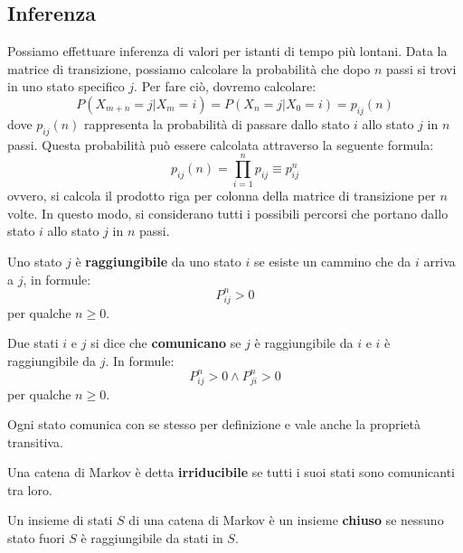 \subsection{Inferenza}
Possiamo effettuare inferenza di valori per istanti di tempo più lontani.
Data la matrice di transizione, possiamo calcolare la probabilità che dopo $n$
passi si trovi in uno stato specifico $j$. Per fare ciò, dovremo calcolare:
\begin{equation}
    P(X_{m + n} = j | X_{m} = i) = P(X_n = j | X_0 = i)=p_{ij}(n)
\end{equation}
dove $p_{ij}(n)$ rappresenta la probabilità di passare dallo stato $i$ allo stato
$j$ in $n$ passi. Questa probabilità può essere calcolata attraverso la seguente
formula:
\begin{equation}
    p_{ij}(n) = \prod_{i = 1}^{n} p_{ij} \equiv p^n_{ij}
\end{equation}
ovvero, si calcola il prodotto riga per colonna della matrice di transizione
per $n$ volte. In questo modo, si considerano tutti i possibili percorsi che
portano dallo stato $i$ allo stato $j$ in $n$ passi.
\begin{definizione}
    Uno stato $j$ è \textbf{raggiungibile} da uno stato $i$ se esiste un cammino
    che da $i$ arriva a $j$, in formule:
    \begin{equation*}
        P^n_{ij}>0
    \end{equation*}
    per qualche $n\geq 0$.
\end{definizione}
\begin{definizione}
    Due stati $i$ e $j$ si dice che \textbf{comunicano} se $j$ è raggiungibile
    da $i$ e $i$ è raggiungibile da $j$. In formule:
    \begin{equation*}
        P^n_{ij}>0 \land P^n_{ji}>0
    \end{equation*}
    per qualche $n\geq 0$.
\end{definizione}
\begin{nota}
    Ogni stato comunica con se stesso per definizione e vale anche la proprietà
    transitiva.
\end{nota}
\begin{definizione}
    Una catena di Markov è detta \textbf{irriducibile} se tutti i suoi stati sono
    comunicanti tra loro.
\end{definizione}
\begin{definizione}
    Un insieme di stati $S$ di una catena di Markov è un insieme \textbf{chiuso}
    se nessuno stato fuori $S$ è raggiungibile da stati in $S$.
\end{definizione}
